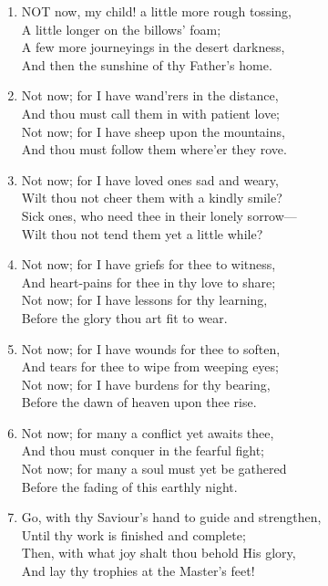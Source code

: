 \documentclass[11pt,a4paper]{article}
\begin{document}
\begin{enumerate}
    \item NOT now, my child! a little more rough tossing, \\
        A little longer on the billows' foam; \\
        A few more journeyings in the desert darkness, \\
        And then the sunshine of thy Father's home.

    \item Not now; for I have wand'rers in the distance, \\
        And thou must call them in with patient love; \\
        Not now; for I have sheep upon the mountains, \\
        And thou must follow them where'er they rove.

    \item Not now; for I have loved ones sad and weary, \\
        Wilt thou not cheer them with a kindly smile? \\
        Sick ones, who need thee in their lonely sorrow--- \\
        Wilt thou not tend them yet a little while?

    \item Not now; for I have griefs for thee to witness, \\
        And heart-pains for thee in thy love to share; \\
        Not now; for I have lessons for thy learning, \\
        Before the glory thou art fit to wear.

    \item Not now; for I have wounds for thee to soften, \\
        And tears for thee to wipe from weeping eyes; \\
        Not now; for I have burdens for thy bearing, \\
        Before the dawn of heaven upon thee rise.

    \item Not now; for many a conflict yet awaits thee, \\
        And thou must conquer in the fearful fight; \\
        Not now; for many a soul must yet be gathered \\
        Before the fading of this earthly night.

    \item Go, with thy Saviour's hand to guide and strengthen, \\
        Until thy work is finished and complete; \\
        Then, with what joy shalt thou behold His glory, \\
        And lay thy trophies at the Master's feet!

\end{enumerate}
\end{document}
